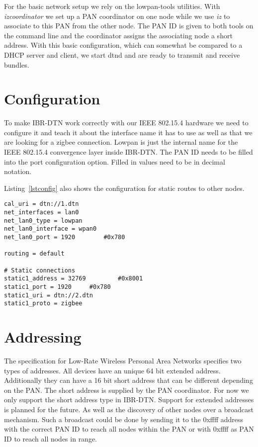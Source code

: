 For the basic network setup we rely on the lowpan-tools utilities. With
\emph{izcoordinator} we set up a PAN coordinator on one
node while we use \emph{iz} to associate to this PAN from the other node. The PAN ID is
given to both tools on the command line and the coordinator assigns the
associating node a short address. With this basic configuration, which can
somewhat be compared to a DHCP server and client, we start dtnd and are ready to
transmit and receive bundles.

\section{Configuration}

To make IBR-DTN work correctly with our IEEE 802.15.4 hardware we need to configure
it and teach it about the interface name it has to use as well as that we are
looking for a zigbee connection. Lowpan is just the internal name for the
IEEE 802.15.4 convergence layer inside IBR-DTN. The PAN ID needs to be filled into the
port configuration option. Filled in values need to be in decimal notation.

Listing~\ref{lstconfig} also shows the configuration for static routes to other
nodes.

\begin{lstlisting}[caption= dtnd example configuration, label=lstconfig]
cal_uri = dtn://1.dtn
net_interfaces = lan0
net_lan0_type = lowpan
net_lan0_interface = wpan0
net_lan0_port = 1920		#0x780

routing = default

# Static connections
static1_address = 32769         #0x8001
static1_port = 1920		#0x780
static1_uri = dtn://2.dtn
static1_proto = zigbee
\end{lstlisting}

\section{Addressing}

The specification for Low-Rate Wireless Personal Area Networks specifies two
types of addresses. All devices have an unique 64 bit extended address.
Additionally they can have a 16 bit short address that can be different depending
on the PAN. The short address is supplied by the PAN coordinator. For now we
only support the short address type in IBR-DTN. Support for extended addresses
is planned for the future. As well as the discovery of other nodes over a
broadcast mechanism. Such a broadcast could be done by sending it to the 0xffff
address with the correct PAN ID to reach all nodes within the PAN or with 0xffff
as PAN ID to reach all nodes in range.

